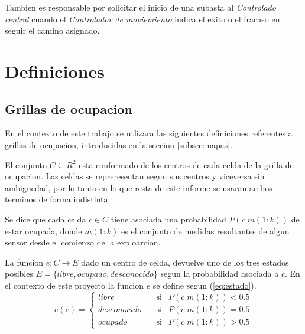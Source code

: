 Tambien es responsable por solicitar el inicio de una subasta al
\emph{Controlado central} cuando el \emph{Controlador de moviemiento} indica el
exito o el fracaso en seguir el camino asignado.



\section{Definiciones}
\subsection{Grillas de ocupacion}
En el contexto de este trabajo se utlizara las siguientes definiciones referentes a
grillas de ocupacion, introducidas en la seccion \ref{subsec:mapas}.

El conjunto $C\subseteq R^2$ esta conformado de los centros de cada celda de la
grilla de ocupacion. Las celdas se repreresentan segun sus centros y viceversa
sin ambigüedad, por lo tanto en lo que resta de este informe se usaran ambos
terminos de forma indistinta.

Se dice que cada celda $c\in C$ tiene asociada una probabilidad $P(c|m(1:k))$
de estar ocupada, donde $m(1:k)$ es el conjunto de medidas resultantes de algun
sensor desde el comienzo de la exploarcion.

La funcion $e : C \rightarrow E$ dado un centro de celda, devuelve uno de los
tres estados posibles $E=\{libre, ocupado, desconocido\}$ segun la probabilidad
asociada a $c$. En el contexto de este proyecto la funcion $e$ se define segun
(\ref{eq:estado}).
\begin{equation} 
  e(c)= 
  \left \{ 
    \begin{aligned}
       libre       &\ \ \ \text{ si}& P(c|m(1:k)) < 0.5 \\
       desconocido &\ \ \ \text{ si}& P(c|m(1:k)) = 0.5 \\
       ocupado     &\ \ \ \text{ si}& P(c|m(1:k)) > 0.5
    \end{aligned}
  \right .
  \label{eq:estado}
\end{equation}

